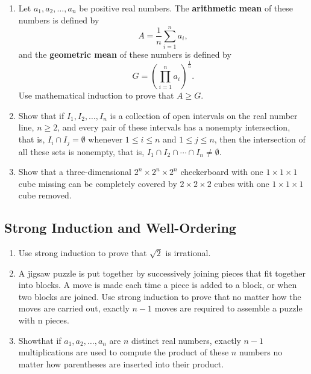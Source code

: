 \documentclass{../../cls/sig-alternate-05-2015}
\begin{document}
\begin{enumerate}
\item Let $a_1, a_2, \ldots, a_n$ be positive real numbers.
The \textbf{arithmetic mean} of these numbers is defined by \begin{equation}
    A = \frac{1}{n} \sum_{i = 1}^n a_i,
\end{equation} and the \textbf{geometric mean} of these numbers is defined by \begin{equation}
    G = \left(\prod_{i = 1}^{n} a_i\right)^\frac{1}{n}.
\end{equation}
Use mathematical induction to prove that $A \ge G$.

\item Show that if $I_1, I_2, \ldots, I_n$ is a collection of open intervals on the real number line,
$n \ge 2$,
and every pair of these intervals has a nonempty intersection,
that is,
$I_i \cap I_j = \emptyset$ whenever $1 \le i \le n$ and $1 \le j \le n$,
then the intersection of all these sets is nonempty, that is,
$I_1 \cap I_2 \cap \cdots \cap I_n \ne \emptyset$.

\item Show that a three-dimensional $2^n \times 2^n \times 2^n$ checkerboard with one $1 \times 1 \times 1$ cube missing can be completely covered by $2 \times 2 \times 2$ cubes with one $1 \times 1 \times 1$ cube removed.

\end{enumerate}

\subsection{Strong Induction and Well-Ordering}
\begin{enumerate}
\item Use strong induction to prove that $\sqrt{2}$ is irrational.

\item A jigsaw puzzle is put together by successively joining
pieces that fit together into blocks. A move is made each
time a piece is added to a block, or when two blocks
are joined. Use strong induction to prove that no matter
how the moves are carried out, exactly $n - 1$ moves are
required to assemble a puzzle with n pieces.

\item Showthat if $a_1, a_2, \ldots, a_n$ are $n$ distinct real numbers, exactly $n - 1$ multiplications are used to compute the product of these $n$ numbers no matter how parentheses are inserted into their product.

\end{enumerate}
\end{document}
